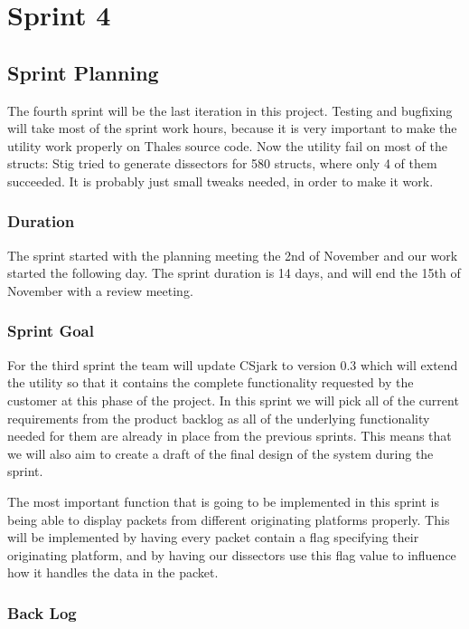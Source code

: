 \chapter{Sprint 4}


\section{Sprint Planning}
The fourth sprint will be the last iteration in this project. Testing and bugfixing will take most of the sprint work hours, because it is very important to make the utility work properly on Thales source code. Now the utility fail on most of the structs: Stig tried to generate dissectors for 580 structs, where only 4 of them succeeded. It is probably just small tweaks needed, in order to make it work. 

\subsection{Duration}
The sprint started with the planning meeting the 2nd of November and our work started the following day. The sprint duration is 14 days, and will end the 15th of November with a review meeting. 


\subsection{Sprint Goal}
For the third sprint the team will update CSjark to version 0.3 which will extend the \gls{utility} so that it contains the complete functionality requested by the customer at this phase of the project. In this sprint we will pick all of the current requirements from the product backlog as all of the underlying functionality needed for them are already in place from the previous sprints. This means that we will also aim to create a draft of the final design of the system during the sprint.

The most important function that is going to be implemented in this sprint is being able to display packets from different originating platforms properly. This will be implemented by having every \gls{packet} contain a flag specifying their originating platform, and by having our \glspl{dissector} use this flag value to influence how it handles the data in the \gls{packet}.

\subsection{Back Log}


